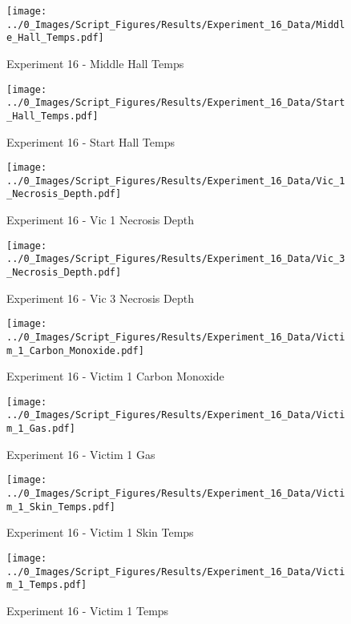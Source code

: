 	\clearpage

	\begin{figure}[H]
		\centering
		\texttt{[image: ../0\_Images/Script\_Figures/Results/Experiment\_16\_Data/Middle\_Hall\_Temps.pdf]}
		\caption[]{Experiment 16 - Middle Hall Temps}
	\end{figure}
 

	\begin{figure}[H]
		\centering
		\texttt{[image: ../0\_Images/Script\_Figures/Results/Experiment\_16\_Data/Start\_Hall\_Temps.pdf]}
		\caption[]{Experiment 16 - Start Hall Temps}
	\end{figure}
 
	\clearpage

	\begin{figure}[H]
		\centering
		\texttt{[image: ../0\_Images/Script\_Figures/Results/Experiment\_16\_Data/Vic\_1\_Necrosis\_Depth.pdf]}
		\caption[]{Experiment 16 - Vic 1 Necrosis Depth}
	\end{figure}
 

	\begin{figure}[H]
		\centering
		\texttt{[image: ../0\_Images/Script\_Figures/Results/Experiment\_16\_Data/Vic\_3\_Necrosis\_Depth.pdf]}
		\caption[]{Experiment 16 - Vic 3 Necrosis Depth}
	\end{figure}
 
	\clearpage

	\begin{figure}[H]
		\centering
		\texttt{[image: ../0\_Images/Script\_Figures/Results/Experiment\_16\_Data/Victim\_1\_Carbon\_Monoxide.pdf]}
		\caption[]{Experiment 16 - Victim 1 Carbon Monoxide}
	\end{figure}
 

	\begin{figure}[H]
		\centering
		\texttt{[image: ../0\_Images/Script\_Figures/Results/Experiment\_16\_Data/Victim\_1\_Gas.pdf]}
		\caption[]{Experiment 16 - Victim 1 Gas}
	\end{figure}
 
	\clearpage

	\begin{figure}[H]
		\centering
		\texttt{[image: ../0\_Images/Script\_Figures/Results/Experiment\_16\_Data/Victim\_1\_Skin\_Temps.pdf]}
		\caption[]{Experiment 16 - Victim 1 Skin Temps}
	\end{figure}
 

	\begin{figure}[H]
		\centering
		\texttt{[image: ../0\_Images/Script\_Figures/Results/Experiment\_16\_Data/Victim\_1\_Temps.pdf]}
		\caption[]{Experiment 16 - Victim 1 Temps}
	\end{figure}
 
